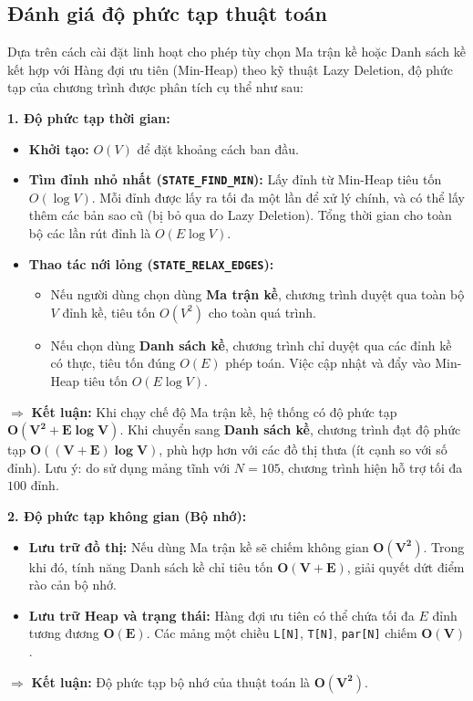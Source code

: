 \documentclass[12pt,a4paper,oneside]{report}
\begin{document}
\subsection*{Đánh giá độ phức tạp thuật toán}
Dựa trên cách cài đặt linh hoạt cho phép tùy chọn Ma trận kề hoặc Danh sách kề kết hợp với Hàng đợi ưu tiên (Min-Heap) theo kỹ thuật Lazy Deletion, độ phức tạp của chương trình được phân tích cụ thể như sau:

\textbf{1. Độ phức tạp thời gian:}
\begin{itemize}
    \item \textbf{Khởi tạo:} $O(V)$ để đặt khoảng cách ban đầu.
    \item \textbf{Tìm đỉnh nhỏ nhất (\texttt{STATE\_FIND\_MIN}):} Lấy đỉnh từ Min-Heap tiêu tốn $O(\log V)$. Mỗi đỉnh được lấy ra tối đa một lần để xử lý chính, và có thể lấy thêm các bản sao cũ (bị bỏ qua do Lazy Deletion). Tổng thời gian cho toàn bộ các lần rút đỉnh là $O(E \log V)$.
    \item \textbf{Thao tác nới lỏng (\texttt{STATE\_RELAX\_EDGES}):} 
    \begin{itemize}
        \item Nếu người dùng chọn dùng \textbf{Ma trận kề}, chương trình duyệt qua toàn bộ $V$ đỉnh kề, tiêu tốn $O(V^2)$ cho toàn quá trình.
        \item Nếu chọn dùng \textbf{Danh sách kề}, chương trình chỉ duyệt qua các đỉnh kề có thực, tiêu tốn đúng $O(E)$ phép toán. Việc cập nhật và đẩy vào Min-Heap tiêu tốn $O(E \log V)$.
    \end{itemize}
\end{itemize}
$\Rightarrow$ \textbf{Kết luận:} Khi chạy chế độ Ma trận kề, hệ thống có độ phức tạp $\mathbf{O(V^2 + E \log V)}$. Khi chuyển sang \textbf{Danh sách kề}, chương trình đạt độ phức tạp $\mathbf{O((V + E) \log V)}$, phù hợp hơn với các đồ thị thưa (ít cạnh so với số đỉnh). Lưu ý: do sử dụng mảng tĩnh với $N = 105$, chương trình hiện hỗ trợ tối đa $100$ đỉnh.

\textbf{2. Độ phức tạp không gian (Bộ nhớ):}
\begin{itemize}
    \item \textbf{Lưu trữ đồ thị:} Nếu dùng Ma trận kề sẽ chiếm không gian $\mathbf{O(V^2)}$. Trong khi đó, tính năng Danh sách kề chỉ tiêu tốn $\mathbf{O(V+E)}$, giải quyết dứt điểm rào cản bộ nhớ.
    \item \textbf{Lưu trữ Heap và trạng thái:} Hàng đợi ưu tiên có thể chứa tối đa $E$ đỉnh tương đương $\mathbf{O(E)}$. Các mảng một chiều \texttt{L[N]}, \texttt{T[N]}, \texttt{par[N]} chiếm $\mathbf{O(V)}$.
\end{itemize}
$\Rightarrow$ \textbf{Kết luận:} Độ phức tạp bộ nhớ của thuật toán là $\mathbf{O(V^2)}$.
\end{document}
